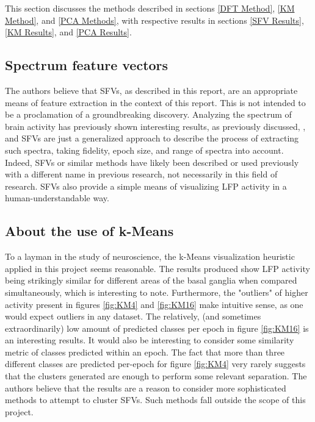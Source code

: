 \documentclass{kththesis}
\begin{document}
This section discusses the methods described in sections \ref{DFT Method}, \ref{KM Method}, and \ref{PCA Methods}, with respective results in sections \ref{SFV Results}, \ref{KM Results}, and \ref{PCA Results}.

\subsection{Spectrum feature vectors}

The authors believe that SFVs, as described in this report, are an appropriate means of feature extraction in the context of this report. 
This is not intended to be a proclamation of a groundbreaking discovery.
Analyzing the spectrum of brain activity has previously shown interesting results, as previously discussed, \parencite{Cagnan}, and SFVs are just a generalized approach to describe the process of extracting such spectra, taking fidelity, epoch size, and range of spectra into account.
Indeed, SFVs or similar methods have likely been described or used previously with a different name in previous research, not necessarily in this field of research.
SFVs also provide a simple means of visualizing LFP activity in a human-understandable way.

\subsection{About the use of k-Means}

To a layman in the study of neuroscience, the k-Means visualization heuristic applied in this project seems reasonable.
The results produced show LFP activity being strikingly similar for different areas of the basal ganglia when compared simultaneously, which is interesting to note.
Furthermore, the "outliers" of higher activity present in figures \ref{fig:KM4} and \ref{fig:KM16} make intuitive sense, as one would expect outliers in any dataset.
The relatively, (and sometimes extraordinarily) low amount of predicted classes per epoch in figure \ref{fig:KM16} is an interesting results. 
It would also be interesting to consider some similarity metric of classes predicted within an epoch.
The fact that more than three different classes are predicted per-epoch for figure \ref{fig:KM4} very rarely suggests that the clusters generated are enough to perform some relevant separation.
The authors believe that the results are a reason to consider more sophisticated methods to attempt to cluster SFVs.
Such methods fall outside the scope of this project.
\end{document}
